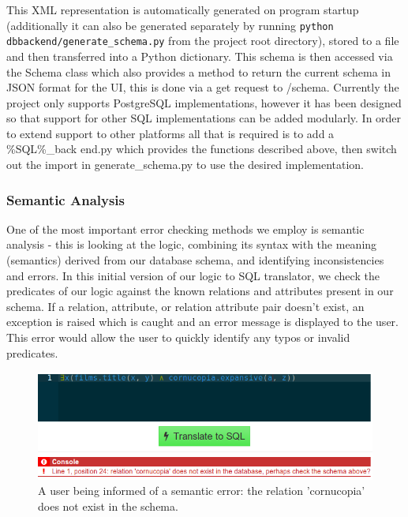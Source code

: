 \documentclass[a4paper, 11pt]{article}
\begin{document}
      This XML representation is automatically generated on program startup
      (additionally it can also be generated separately by running \texttt{python
      dbbackend/generate\_schema.py} from the project root directory),
      stored to a file and then transferred into a Python dictionary. This
      schema is then accessed via the Schema class which also provides a method
      to return the current schema in JSON format for the UI, this is done via a
      get request to /schema.
      Currently the project only supports PostgreSQL implementations, however it
      has been designed so that support for other SQL implementations can be
      added modularly. In order to extend support to other platforms all that is
      required is to add a \%SQL\%\_back end.py which provides the functions
      described above, then switch out the import in generate\_schema.py to use
      the desired implementation.



    \subsubsection{Semantic Analysis}
      One of the most important error checking methods we employ is semantic
      analysis - this is looking at the logic, combining its syntax with the
      meaning (semantics) derived from our database schema, and identifying
      inconsistencies and errors. In this initial version of our logic to SQL
      translator, we check the predicates of our logic against the known
      relations and attributes present in our schema. If a relation, attribute,
      or relation attribute pair doesn't exist, an exception is raised which is
      caught and an error message is displayed to the user. This error would
      allow the user to quickly identify any typos or invalid predicates.

      \begin{figure}[h!]
        \centering
        \includegraphics[width=1.0\textwidth]{images/error.png}
        \caption{A user being informed of a semantic error: the relation
          'cornucopia' does not exist in the schema.}
      \end{figure}
\end{document}
